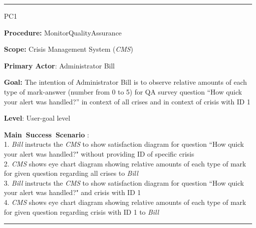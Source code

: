 \hrule
\begin{lyxlist}{PC1}
\small{
\item [\textbf{Procedure:}] MonitorQualityAssurance
\item [\textbf{Scope:}] Crisis Management System (\emph{CMS})
\item [\textbf{Primary Actor}:] Administrator Bill
\item [\textbf{Goal:}] The intention of Administrator Bill is to observe
relative amounts of each type of mark-answer (number from 0 to 5) for QA survey
question ``How quick your alert was handled?'' in context of all crises and in
context of crisis with ID 1
\item [\textbf{Level}:] User-goal level
\item [\textbf{Main~Success~Scenario}]:\\
1. \emph{Bill} instructs the \emph{CMS} to show satisfaction diagram for
question ``How quick your alert was handled?" without providing ID of specific
crisis\\
2. \emph{CMS} shows eye chart diagram showing relative amounts of each type of
mark for given question regarding all crises to \emph{Bill}\\
3. \emph{Bill} instructs the \emph{CMS} to show satisfaction diagram for
question ``How quick your alert was handled?" and crisis with ID 1\\
4. \emph{CMS} shows eye chart diagram showing relative amounts of each type of
mark for given question regarding crisis with ID 1 to \emph{Bill}
}
\end{lyxlist}
\hrule
